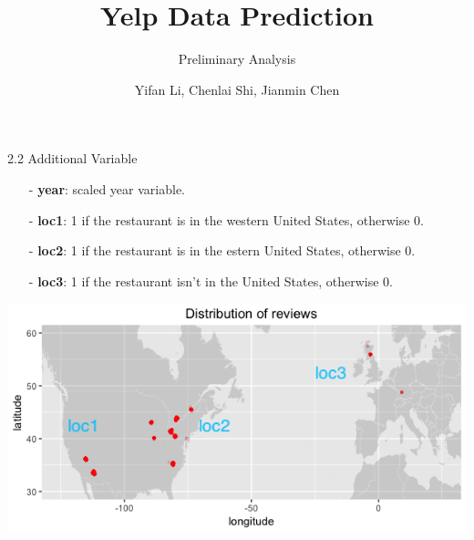 \documentclass[10pt]{beamer}
\title{Yelp Data Prediction}
\subtitle{Preliminary Analysis}
\date{}
\author{Yifan Li, Chenlai Shi, Jianmin Chen}
\institute{Monday Group 1}
\begin{document}
\maketitle

\begin{frame}{2.2 Additional Variable}

\begin{itemize}
    \item[-] \textbf{year}: scaled year variable.
    
    \item[-] \textbf{loc1}: 1 if the restaurant is in the western United States, otherwise 0.
        
    \item[-] \textbf{loc2}: 1 if the restaurant is in the estern United States, otherwise 0.
    
    \item[-] \textbf{loc3}: 1 if the restaurant isn't in the United States, otherwise 0.

\end{itemize}
\includegraphics[scale=0.4]{../image/worldmap.png}
\end{frame}
\end{document}
